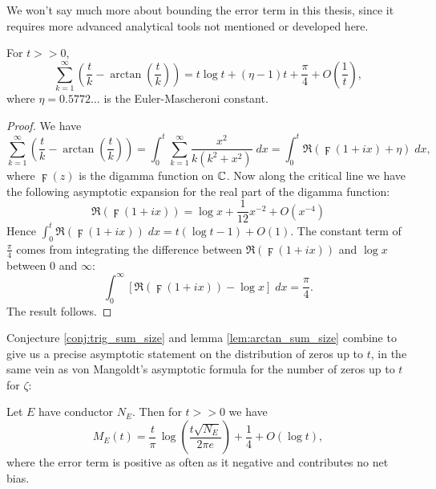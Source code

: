 We won't say much more about bounding the error term in this thesis, since it requires more advanced analytical tools not mentioned or developed here. \\

\begin{lemma}\label{lem:arctan_sum_size}
For $t >> 0$, 
\begin{equation}
\sum_{k=1}^{\infty} \left(\frac{t}{k} - \arctan\left(\frac{t}{k}\right)\right) = t\log t + (\eta-1)t + \frac{\pi}{4} + O\left(\frac{1}{t}\right),
\end{equation}
where $\eta = 0.5772\ldots$ is the Euler-Mascheroni constant.
\end{lemma}
\begin{proof}
We have
\begin{equation*}
\sum_{k=1}^{\infty} \left(\frac{t}{k} - \arctan\left(\frac{t}{k}\right)\right) = \int_{0}^{t} \sum_{k=1}^{\infty} \frac{x^2}{k(k^2+x^2)} \; dx = \int_{0}^{t} \Re\left(\digamma(1+ix) + \eta\right) \; dx,
\end{equation*}
where $\digamma(z)$ is the digamma function on $\mathbb{C}$. Now along the critical line we have the following asymptotic expansion for the real part of the digamma function:
\begin{equation}
\Re\left(\digamma(1+ix)\right) = \log x + \frac{1}{12} x^{-2} + O(x^{-4})
\end{equation}
Hence $\int_{0}^{t} \Re\left(\digamma(1+ix)\right) \; dx = t(\log t - 1)  + O(1)$. The constant term of $\frac{\pi}{4}$ comes from integrating the difference between $\Re\left(\digamma(1+ix)\right)$ and $\log x$ between $0$ and $\infty$:
\begin{equation*}
\int_{0}^{\infty} \left[\Re\left(\digamma(1+ix)\right) - \log x\right] \; dx = \frac{\pi}{4}.
\end{equation*}
The result follows.
\end{proof}

Conjecture \ref{conj:trig_sum_size} and lemma \ref{lem:arctan_sum_size} combine to give us a precise asymptotic statement on the distribution of zeros up to $t$, in the same vein as von Mangoldt's asymptotic formula for the number of zeros up to $t$ for $\zeta$:

\begin{theorem}\label{thm:zero_density}
Let $E$ have conductor $N_E$. Then for $t>>0$ we have
\begin{equation}\label{eqn:zero_density}
M_E(t) = \frac{t}{\pi} \, \log\left(\frac{t\sqrt{N_E}}{2\pi e}\right) + \frac{1}{4} + O(\log t),
\end{equation}
where the error term is positive as often as it negative and contributes no net bias.
\end{theorem}

